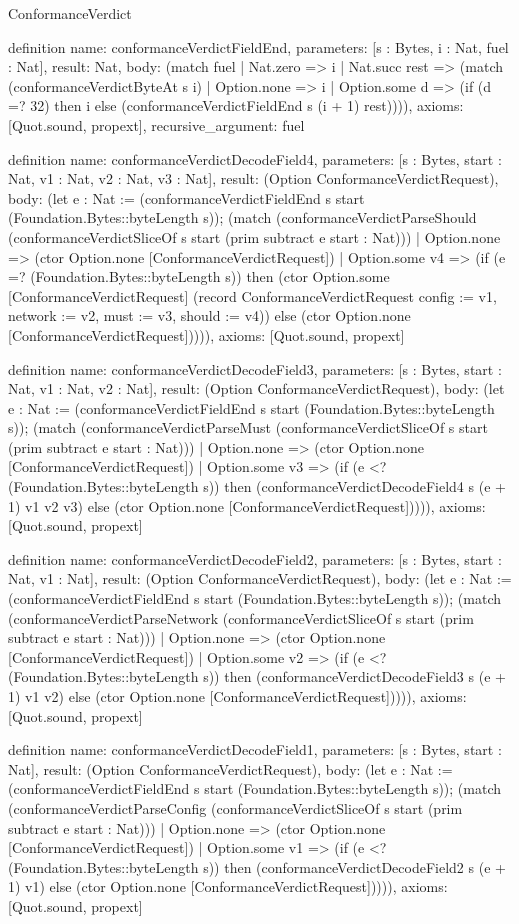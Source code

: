 \begin{lexlean}{ConformanceVerdict}
\begin{semanticmodule}
definition{
  name: conformanceVerdictFieldEnd,
  parameters: [s : Bytes, i : Nat, fuel : Nat],
  result: Nat,
  body: (match fuel
    | Nat.zero => i
    | Nat.succ rest => (match (conformanceVerdictByteAt s i)
      | Option.none => i
      | Option.some d => (if (d =? 32) then i else (conformanceVerdictFieldEnd s (i + 1) rest)))),
  axioms: [Quot.sound, propext],
  recursive_argument: fuel
}

definition{
  name: conformanceVerdictDecodeField4,
  parameters: [s : Bytes, start : Nat, v1 : Nat, v2 : Nat, v3 : Nat],
  result: (Option ConformanceVerdictRequest),
  body: (let e : Nat := (conformanceVerdictFieldEnd s start (Foundation.Bytes::byteLength s)); (match (conformanceVerdictParseShould (conformanceVerdictSliceOf s start (prim subtract e start : Nat)))
    | Option.none => (ctor Option.none [ConformanceVerdictRequest])
    | Option.some v4 => (if (e =? (Foundation.Bytes::byteLength s)) then (ctor Option.some [ConformanceVerdictRequest] (record ConformanceVerdictRequest {config := v1, network := v2, must := v3, should := v4})) else (ctor Option.none [ConformanceVerdictRequest])))),
  axioms: [Quot.sound, propext]
}

definition{
  name: conformanceVerdictDecodeField3,
  parameters: [s : Bytes, start : Nat, v1 : Nat, v2 : Nat],
  result: (Option ConformanceVerdictRequest),
  body: (let e : Nat := (conformanceVerdictFieldEnd s start (Foundation.Bytes::byteLength s)); (match (conformanceVerdictParseMust (conformanceVerdictSliceOf s start (prim subtract e start : Nat)))
    | Option.none => (ctor Option.none [ConformanceVerdictRequest])
    | Option.some v3 => (if (e <? (Foundation.Bytes::byteLength s)) then (conformanceVerdictDecodeField4 s (e + 1) v1 v2 v3) else (ctor Option.none [ConformanceVerdictRequest])))),
  axioms: [Quot.sound, propext]
}

definition{
  name: conformanceVerdictDecodeField2,
  parameters: [s : Bytes, start : Nat, v1 : Nat],
  result: (Option ConformanceVerdictRequest),
  body: (let e : Nat := (conformanceVerdictFieldEnd s start (Foundation.Bytes::byteLength s)); (match (conformanceVerdictParseNetwork (conformanceVerdictSliceOf s start (prim subtract e start : Nat)))
    | Option.none => (ctor Option.none [ConformanceVerdictRequest])
    | Option.some v2 => (if (e <? (Foundation.Bytes::byteLength s)) then (conformanceVerdictDecodeField3 s (e + 1) v1 v2) else (ctor Option.none [ConformanceVerdictRequest])))),
  axioms: [Quot.sound, propext]
}

definition{
  name: conformanceVerdictDecodeField1,
  parameters: [s : Bytes, start : Nat],
  result: (Option ConformanceVerdictRequest),
  body: (let e : Nat := (conformanceVerdictFieldEnd s start (Foundation.Bytes::byteLength s)); (match (conformanceVerdictParseConfig (conformanceVerdictSliceOf s start (prim subtract e start : Nat)))
    | Option.none => (ctor Option.none [ConformanceVerdictRequest])
    | Option.some v1 => (if (e <? (Foundation.Bytes::byteLength s)) then (conformanceVerdictDecodeField2 s (e + 1) v1) else (ctor Option.none [ConformanceVerdictRequest])))),
  axioms: [Quot.sound, propext]
}


\end{semanticmodule}
\end{lexlean}
